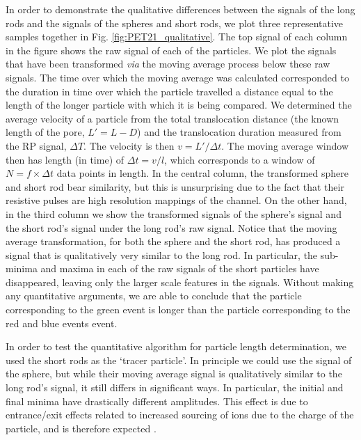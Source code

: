 			In order to demonstrate the qualitative differences between the signals of the long rods and the signals of the spheres and short rods, we plot three representative samples together in Fig. \ref{fig:PET21_qualitative}. The top signal of each column in the figure shows the raw signal of each of the particles. We plot the signals that have been transformed \textit{via} the moving average process below these raw signals. The time over which the moving average was calculated corresponded to the duration in time over which the particle travelled a distance equal to the length of the longer particle with which it is being compared. We determined the average velocity of a particle from the total translocation distance (the known length of the pore, $L'=L-D$) and the translocation duration measured from the RP signal, $\Delta T$. The velocity is then $v=L'/\Delta t$. The moving average window then has length (in time) of $\Delta t=v/l$, which corresponds to a window of $N=f\times\Delta t$ data points in length. In the central column, the transformed sphere and short rod bear similarity, but this is unsurprising due to the fact that their resistive pulses are high resolution mappings of the channel. On the other hand, in the third column we show the transformed signals of the sphere's signal and the short rod's signal under the long rod's raw signal. Notice that the moving average transformation, for both the sphere and the short rod, has produced a signal that is qualitatively very similar to the long rod. In particular, the sub-minima and maxima in each of the raw signals of the short particles have disappeared, leaving only the larger scale features in the signals. Without making any quantitative arguments, we are able to conclude that the particle corresponding to the green event is longer than the particle corresponding to the red and blue events event. 
			
			In order to test the quantitative algorithm for particle length determination, we used the short rods as the `tracer particle'. In principle we could use the signal of the sphere, but while their moving average signal is qualitatively similar to the long rod's signal, it still differs in significant ways. In particular, the initial and final minima have drastically different amplitudes. This effect is due to entrance/exit effects related to increased sourcing of ions due to the charge of the particle, and is therefore expected \cite{Menestrina2014}. 
			
